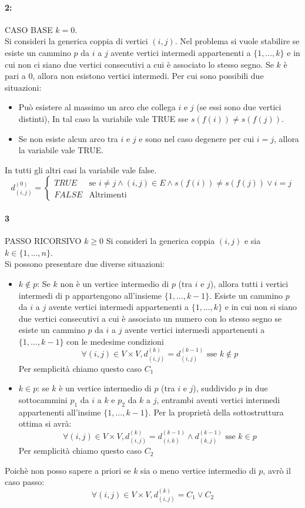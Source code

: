 \documentclass[12pt, a4paper, openany]{book}
\begin{document}
\paragraph*{2:} CASO BASE $k=0$.
\\Si consideri la generica coppia di vertici $(i,j)$.
Nel problema si vuole stabilire se esiste un cammino $p$ da $i$ a $j$ avente vertici intermedi appartenenti a $\{1,...,k\}$ e in cui non ci siano due vertici consecutivi a cui è associato lo stesso segno.
Se $k$ è pari a 0, allora non esistono vertici intermedi.
Per cui sono possibili due situazioni:
\begin{itemize}
	\item Può esistere al massimo un arco che collega $i$ e $j$ (se essi sono due vertici distinti), In tal caso la variabile vale TRUE sse $s(f(i))\neq s(f(j))$.
	\item Se non esiste alcun arco tra $i$ e $j$ e sono nel caso degenere per cui $i=j$, allora la variabile vale TRUE.
\end{itemize}
In tutti gli altri casi la variabile vale false.
$$d^{(0)}_{(i,j)}= \begin{cases}
		TRUE  & \text{se } i\neq j \wedge (i,j)\in E \wedge s(f(i)) \neq s(f(j)) \vee i=j \\
		FALSE & \text{Altrimenti}
	\end{cases}
$$
\paragraph*{3} PASSO RICORSIVO $k\geq 0$
Si consideri la generica coppia $(i,j)$ e sia $k\in\{1,...,n\}$.
\\Si possono presentare due diverse situazioni:
\begin{itemize}
	\item $k\notin p$: Se $k$ non è un vertice intermedio di $p$ (tra $i$ e $j$), allora tutti i vertici intermedi di p appartengono all'insieme $\{1,...,k-1\}$.
	      Esiste un cammino $p$ da $i$ a $j$ avente vertici intermedi appartenenti a $\{1,...,k\}$ e in cui non si siano due vertici consecutivi a cui è associato un numero con lo stesso segno se esiste
	      un cammino $p$ da $i$ a $j$ avente vertici intermedi appartenenti a $\{1,...,k-1\}$ con le medesime condizioni
	      $$\forall(i,j)\in V\times V, d^{(k)}_{(i,j)} = d^{(k-1)}_{(i,j)} \text{ sse } k\notin p$$
	      Per semplicità chiamo questo caso $C_1$
	      \item$k\in p$: se $k$ è un vertice intermedio di $p$ (tra $i$ e $j$), suddivido $p$ in due sottocammini $p_1$ da $i$ a $k$ e $p_2$ da $k$ a $j$,
	      entrambi aventi vertici intermedi appartenenti all'insime $\{1,...,k-1\}$.
	      Per la proprietà della sottostruttura ottima si avrà:
	      $$\forall(i,j)\in V\times V, d^{(k)}_{(i,j)} = d^{(k-1)}_{(i,k)} \wedge d^{(k-1)}_{(k,j)} \text{ sse } k\in p$$
	      Per semplicità chiamo questo caso $C_2$
\end{itemize}
Poichè non posso sapere a priori se $k$ sia o meno vertice intermedio di $p$, avrò il caso passo:
$$\forall(i,j)\in V\times V, d^{(k)}_{(i,j)} = C_1 \vee C_2$$
\end{document}
